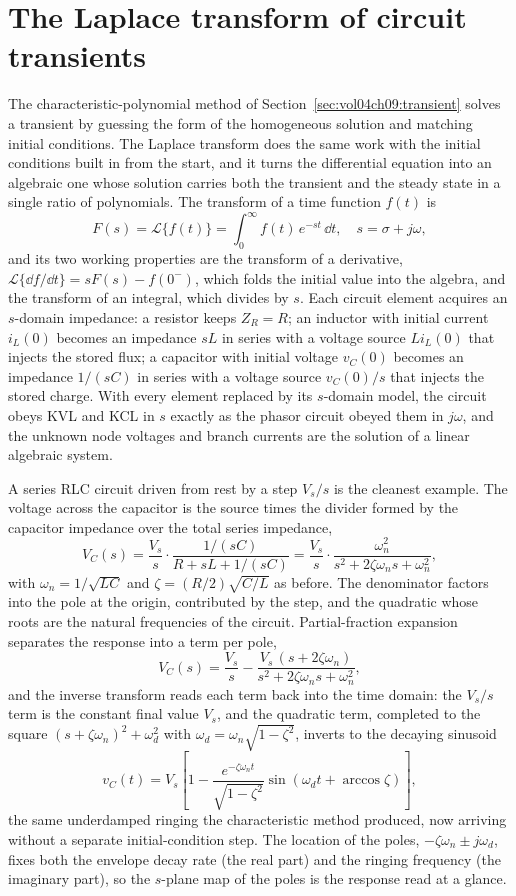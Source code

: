 \section{The Laplace transform of circuit transients}
\label{sec:vol04ch09:laplace}

The characteristic-polynomial method of
Section~\ref{sec:vol04ch09:transient} solves a transient by guessing the
form of the homogeneous solution and matching initial conditions. The
Laplace transform does the same work with the initial conditions built in
from the start, and it turns the differential equation into an algebraic
one whose solution carries both the transient and the steady state in a
single ratio of polynomials. The transform of a time function $f(t)$ is
\[
F(s) = \mathcal{L}\{f(t)\} = \int_{0}^{\infty} f(t)\,e^{-st}\,\dd t,
\quad s = \sigma + j\omega,
\]
and its two working properties are the transform of a derivative,
$\mathcal{L}\{\dd f/\dd t\} = sF(s) - f(0^{-})$, which folds the initial
value into the algebra, and the transform of an integral, which divides by
$s$. Each circuit element acquires an $s$-domain impedance: a resistor
keeps $Z_R = R$; an inductor with initial current $i_L(0)$ becomes an
impedance $sL$ in series with a voltage source $Li_L(0)$ that injects the
stored flux; a capacitor with initial voltage $v_C(0)$ becomes an
impedance $1/(sC)$ in series with a voltage source $v_C(0)/s$ that injects
the stored charge. With every element replaced by its $s$-domain model,
the circuit obeys KVL and KCL in $s$ exactly as the phasor circuit obeyed
them in $j\omega$, and the unknown node voltages and branch currents are
the solution of a linear algebraic system.

A series RLC circuit driven from rest by a step $V_s/s$ is the cleanest
example. The voltage across the capacitor is the source times the divider
formed by the capacitor impedance over the total series impedance,
\[
V_C(s) = \frac{V_s}{s}\cdot
\frac{1/(sC)}{R + sL + 1/(sC)}
= \frac{V_s}{s}\cdot
\frac{\omega_n^{2}}{s^{2} + 2\zeta\omega_n s + \omega_n^{2}},
\]
with $\omega_n = 1/\sqrt{LC}$ and $\zeta = (R/2)\sqrt{C/L}$ as before. The
denominator factors into the pole at the origin, contributed by the step,
and the quadratic whose roots are the natural frequencies of the circuit.
Partial-fraction expansion separates the response into a term per pole,
\[
V_C(s) = \frac{V_s}{s}
- \frac{V_s\,(s + 2\zeta\omega_n)}{s^{2} + 2\zeta\omega_n s + \omega_n^{2}},
\]
and the inverse transform reads each term back into the time domain: the
$V_s/s$ term is the constant final value $V_s$, and the quadratic term,
completed to the square $(s + \zeta\omega_n)^{2} + \omega_d^{2}$ with
$\omega_d = \omega_n\sqrt{1 - \zeta^{2}}$, inverts to the decaying
sinusoid
\[
v_C(t) = V_s\left[1 - \frac{e^{-\zeta\omega_n t}}{\sqrt{1 - \zeta^{2}}}
\sin\!\left(\omega_d t + \arccos\zeta\right)\right],
\]
the same underdamped ringing the characteristic method produced, now
arriving without a separate initial-condition step. The location of the
poles, $-\zeta\omega_n \pm j\omega_d$, fixes both the envelope decay rate
(the real part) and the ringing frequency (the imaginary part), so the
$s$-plane map of the poles is the response read at a glance.

